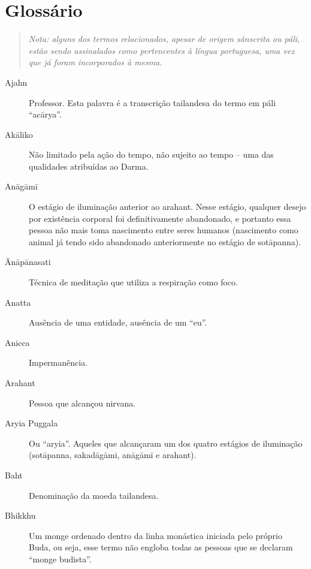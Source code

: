 
\chapter{Glossário}

\begin{quote}
\itshape Nota: alguns dos termos relacionados, apesar de origem sânscrita ou páli, estão sendo assinalados como pertencentes à língua portuguesa, uma vez que já foram incorporados à mesma.
\end{quote}

\begin{description}

  \item[Ajahn] Professor. Esta palavra é a transcrição tailandesa do termo em páli “acārya”.

  \item[Akāliko] Não limitado pela ação do tempo, não sujeito ao tempo – uma das qualidades atribuídas ao Darma.

  \item[Anāgāmī] O estágio de iluminação anterior ao arahant. Nesse estágio, qualquer desejo por existência corporal foi definitivamente abandonado, e portanto essa pessoa não mais toma nascimento entre seres humanos (nascimento como animal já tendo sido abandonado anteriormente no estágio de sotāpanna).

  \item[Ānāpānasati] Técnica de meditação que utiliza a respiração como foco.

  \item[Anatta] Ausência de uma entidade, ausência de um “eu”.

  \item[Anicca] Impermanência.

  \item[Arahant] Pessoa que alcançou nirvana.

  \item[Aryia Puggala] Ou “aryia”. Aqueles que alcançaram um dos quatro estágios de iluminação (sotāpanna, sakadāgāmi, anāgāmī e arahant).

  \item[Baht] Denominação da moeda tailandesa.

  \item[Bhikkhu] Um monge ordenado dentro da linha monástica iniciada pelo próprio Buda, ou seja, esse termo não engloba todas as pessoas que se declaram “monge budista”.


\end{description}
